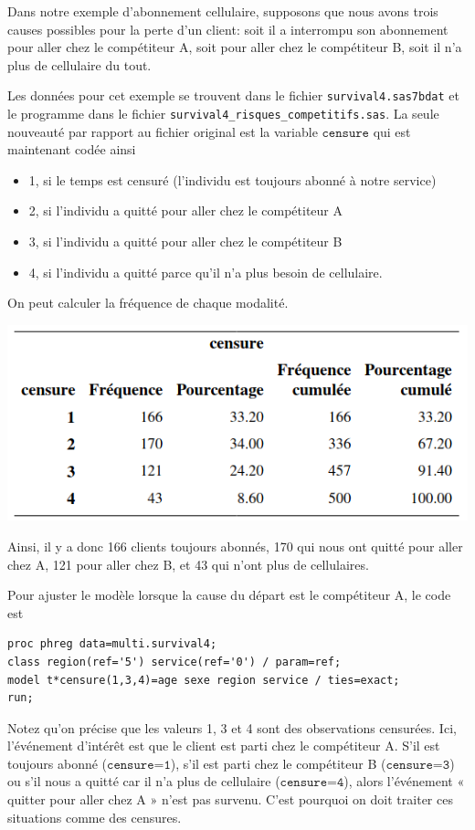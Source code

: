 \documentclass[
  11pt,
  letterpaper,
]{book}
\providecommand{\tightlist}{%
  \setlength{\itemsep}{0pt}\setlength{\parskip}{0pt}}
\theoremstyle{definition}
\theoremstyle{definition}
\theoremstyle{definition}
\theoremstyle{remark}
\begin{document}
Dans notre exemple d'abonnement cellulaire, supposons que nous avons trois causes possibles pour la perte d'un client: soit il a interrompu son abonnement pour aller chez le compétiteur A, soit pour aller chez le compétiteur B, soit il n'a plus de cellulaire du tout.

Les données pour cet exemple se trouvent dans le fichier \texttt{survival4.sas7bdat} et le programme dans le fichier \texttt{survival4\_risques\_competitifs.sas}. La seule nouveauté par rapport au fichier original est la variable \(\texttt{censure}\) qui est maintenant codée ainsi

\begin{itemize}
\tightlist
\item
  1, si le temps est censuré (l'individu est toujours abonné à notre service)
\item
  2, si l'individu a quitté pour aller chez le compétiteur A
\item
  3, si l'individu a quitté pour aller chez le compétiteur B
\item
  4, si l'individu a quitté parce qu'il n'a plus besoin de cellulaire.
\end{itemize}

On peut calculer la fréquence de chaque modalité.

\begin{center}\includegraphics[width=0.65\linewidth]{figures/05-survie-e23} \end{center}

Ainsi, il y a donc 166 clients toujours abonnés, 170 qui nous ont quitté pour aller chez A, 121 pour aller chez B, et 43 qui n'ont plus de cellulaires.

Pour ajuster le modèle lorsque la cause du départ est le compétiteur A, le code est

\begin{verbatim}
proc phreg data=multi.survival4;
class region(ref='5') service(ref='0') / param=ref;
model t*censure(1,3,4)=age sexe region service / ties=exact; 
run;
\end{verbatim}

Notez qu'on précise que les valeurs 1, 3 et 4 sont des observations censurées. Ici, l'événement d'intérêt est que le client est parti chez le compétiteur A. S'il est toujours abonné (\(\texttt{censure=1}\)), s'il est parti chez le compétiteur B (\(\texttt{censure=3}\)) ou s'il nous a quitté car il n'a plus de cellulaire (\(\texttt{censure=4}\)), alors l'événement « quitter pour aller chez A » n'est pas survenu. C'est pourquoi on doit traiter ces situations comme des censures.
\end{document}
